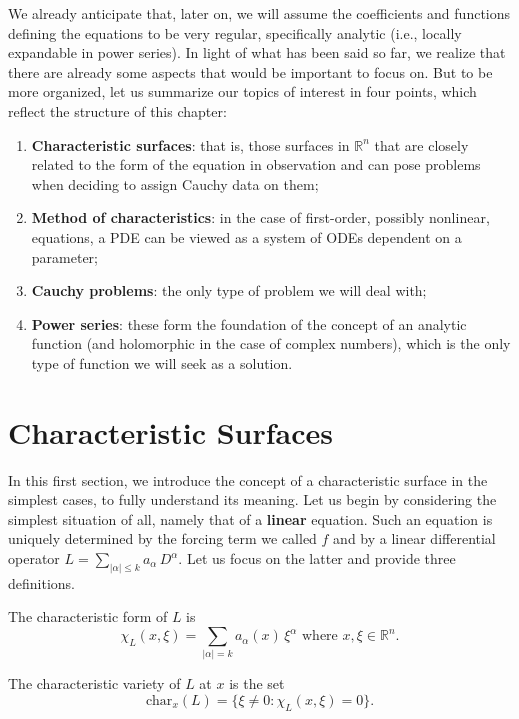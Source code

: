 We already anticipate that, later on, we will assume the coefficients and functions defining the equations to be very regular, specifically analytic (i.e., locally expandable in power series).
\newpage
In light of what has been said so far, we realize that there are already some aspects that would be important to focus on. 
But to be more organized, let us summarize our topics of interest in four points, which reflect the structure of this chapter:
\begin{enumerate}
\item \textbf{Characteristic surfaces}: that is, those surfaces in $\mathbb{R}^n$ that are closely related to the form of the equation in observation and can pose problems when deciding to assign Cauchy data on them;
\item \textbf{Method of characteristics}: in the case of first-order, possibly nonlinear, equations, a PDE can be viewed as a system of ODEs dependent on a parameter;
\item \textbf{Cauchy problems}: the only type of problem we will deal with;
\item \textbf{Power series}: these form the foundation of the concept of an analytic function (and holomorphic in the case of complex numbers), which is the only type of function we will seek as a solution.
\end{enumerate}

\section{Characteristic Surfaces} \label{supcar}
In this first section, we introduce the concept of a characteristic surface in the simplest cases, to fully understand its meaning. Let us begin by considering the simplest situation of all, namely that of a \textbf{linear} equation. 
Such an equation is uniquely determined by the forcing term we called $f$ and by a linear differential operator $L=\sum_{|\alpha |\leq k} a_\alpha \, D^\alpha$. Let us focus on the latter and provide three definitions.

\begin{definition}
The characteristic form of $L$ is 
$$\chi_L(x,\xi)=\sum_{|\alpha |= k} a_\alpha(x) \, \xi^\alpha \text{ where } {x,\xi \in \mathbb{R}^n}.$$
\end{definition}

\begin{definition}
The characteristic variety of $L$ at $x$ is the set $$\text{char}_x (L)= \{ \xi \neq 0 : \chi_L(x,\xi)=0 \}.$$
\end{definition}

